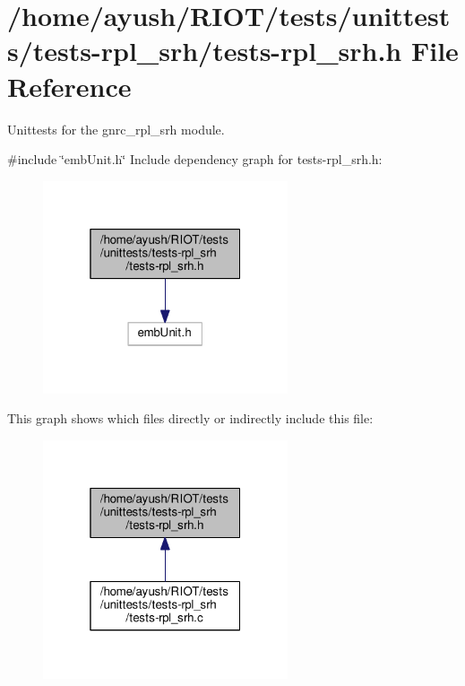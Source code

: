\hypertarget{tests-rpl__srh_8h}{}\section{/home/ayush/\+R\+I\+O\+T/tests/unittests/tests-\/rpl\+\_\+srh/tests-\/rpl\+\_\+srh.h File Reference}
\label{tests-rpl__srh_8h}


Unittests for the {\ttfamily gnrc\+\_\+rpl\+\_\+srh} module.  


{\ttfamily \#include \char`\"{}emb\+Unit.\+h\char`\"{}}\newline
Include dependency graph for tests-\/rpl\+\_\+srh.h\+:
\nopagebreak
\begin{figure}[H]
\begin{center}
\leavevmode
\includegraphics[width=205pt]{tests-rpl__srh_8h__incl}
\end{center}
\end{figure}
This graph shows which files directly or indirectly include this file\+:
\nopagebreak
\begin{figure}[H]
\begin{center}
\leavevmode
\includegraphics[width=205pt]{tests-rpl__srh_8h__dep__incl}
\end{center}
\end{figure}
